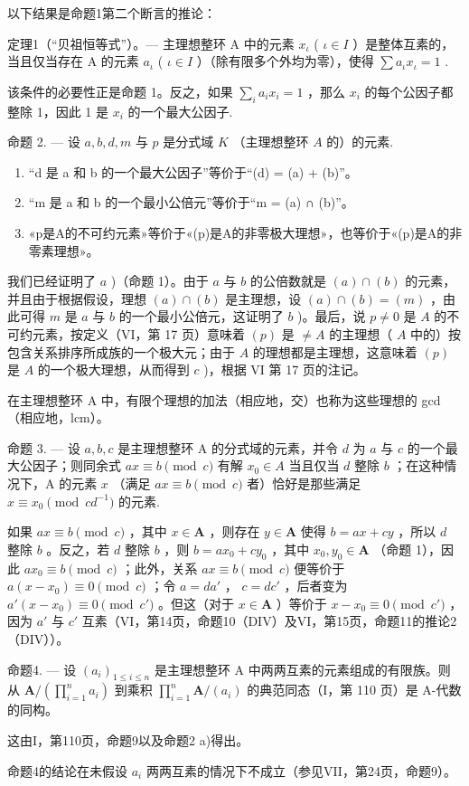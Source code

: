 以下结果是命题1第二个断言的推论：

定理1（“贝祖恒等式”）。--- 主理想整环 A 中的元素 \(x_{\iota}\) ( \(\iota \in I\) ）是整体互素的，当且仅当存在 A 的元素 \(a_{\iota}\) ( \(\iota \in I\) ）（除有限多个外均为零），使得 \(\sum a_{\iota}x_{\iota} = 1\) .

该条件的必要性正是命题 1。反之，如果 \(\sum_{i} a_i x_i = 1\) ，那么 \(x_i\) 的每个公因子都整除 1，因此 1 是 \(x_i\) 的一个最大公因子.

命题 2. --- 设 \(a, b, d, m\) 与 \(p\) 是分式域 \(K\) （主理想整环 \(A\) 的）的元素.

\begin{enumerate}
\def\labelenumi{\alph{enumi})}
\item
  “d 是 a 和 b 的一个最大公因子”等价于“(d) = (a) + (b)”。
\item
  “m 是 a 和 b 的一个最小公倍元”等价于“m = (a) ∩ (b)”。
\item
  «p是A的不可约元素»等价于«(p)是A的非零极大理想»，也等价于«(p)是A的非零素理想»。
\end{enumerate}

我们已经证明了 \(a\) )（命题 1）。由于 \(a\) 与 \(b\) 的公倍数就是 \((a) \cap (b)\) 的元素，并且由于根据假设，理想 \((a) \cap (b)\) 是主理想，设 \((a) \cap (b) = (m)\) ，由此可得 \(m\) 是 \(a\) 与 \(b\) 的一个最小公倍元，这证明了 \(b\) )。最后，说 \(p \neq 0\) 是 \(A\) 的不可约元素，按定义（VI，第 17 页）意味着 \((p)\) 是 \(\neq A\) 的主理想（ \(A\) 中的）按包含关系排序所成族的一个极大元；由于 \(A\) 的理想都是主理想，这意味着 \((p)\) 是 \(A\) 的一个极大理想，从而得到 \(c\) )，根据 VI 第 17 页的注记。

在主理想整环 A 中，有限个理想的加法（相应地，交）也称为这些理想的 gcd（相应地，lcm）。

命题 3. --- 设 \(a, b, c\) 是主理想整环 A 的分式域的元素，并令 \(d\) 为 \(a\) 与 \(c\) 的一个最大公因子；则同余式 \(ax \equiv b \pmod{c}\) 有解 \(x_0 \in A\) 当且仅当 \(d\) 整除 \(b\) ；在这种情况下，A 的元素 \(x\) （满足 \(ax \equiv b \pmod{c}\) 者）恰好是那些满足 \(x \equiv x_0 \pmod{cd^{-1}}\) 的元素.

如果 \(ax \equiv b \pmod{c}\) ，其中 \(x \in \mathbf{A}\) ，则存在 \(y \in \mathbf{A}\) 使得 \(b = ax + cy\) ，所以 \(d\) 整除 \(b\) 。反之，若 \(d\) 整除 \(b\) ，则 \(b = ax_0 + cy_0\) ，其中 \(x_0, y_0 \in \mathbf{A}\) （命题 1），因此 \(ax_0 \equiv b \pmod{c}\) ；此外，关系 \(ax \equiv b \pmod{c}\) 便等价于 \(a(x - x_0) \equiv 0 \pmod{c}\) ；令 \(a = da'\) ， \(c = dc'\) ，后者变为 \(a'(x - x_0) \equiv 0 \pmod{c'}\) 。但这（对于 \(x \in \mathbf{A}\) ）等价于 \(x - x_0 \equiv 0 \pmod{c'}\) ，因为 \(a'\) 与 \(c'\) 互素（VI，第14页，命题10（DIV）及VI，第15页，命题11的推论2（DIV））。

命题4. --- 设 \((a_i)_{1 \leq i \leq n}\) 是主理想整环 A 中两两互素的元素组成的有限族。则从 \(\mathbf{A}/\left(\prod_{i=1}^{n} a_i\right)\) 到乘积 \(\prod_{i=1}^{n} \mathbf{A}/(a_i)\) 的典范同态（I，第 110 页）是 A-代数的同构。

这由I，第110页，命题9以及命题2 a)得出。

命题4的结论在未假设 \(a_{i}\) 两两互素的情况下不成立（参见VII，第24页，命题9）。

